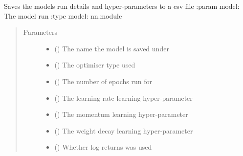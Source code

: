\documentclass[letterpaper,10pt,english]{sphinxmanual}
\begin{document}
\begin{fulllineitems}
\label{\detokenize{index:Forecaster.deeplearning.full_save}}
Saves the models run details and hyper-parameters to a csv file
:param model:               The model run
:type  model:               nn.module
\begin{quote}\begin{description}
\item[{Parameters}] \leavevmode\begin{itemize}
\item {} 
 () \textendash{} The name the model is saved under

\item {} 
 () \textendash{} The optimiser type used

\item {} 
 () \textendash{} The number of epochs run for

\item {} 
 () \textendash{} The learning rate learning hyper-parameter

\item {} 
 () \textendash{} The momentum learning hyper-parameter

\item {} 
 () \textendash{} The weight decay learning hyper-parameter

\item {} 
 () \textendash{} Whether log returns was used


\end{itemize}
\end{description}
\end{quote}
\end{fulllineitems}
\end{document}
